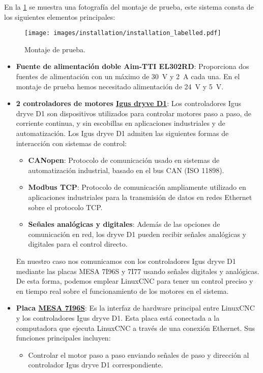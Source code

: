 \documentclass[english,spanish,a4paper,11pt]{article}
\begin{document}
En la \cref{fig:installation} se muestra una fotografía del montaje de prueba, este sistema consta de los siguientes elementos principales:

\begin{figure}[!ht]
    \centering
    \texttt{[image: images/installation/installation\_labelled.pdf]}
    \caption{Montaje de prueba.}
    \label{fig:installation}
\end{figure}


\begin{itemize}
    \item \textbf{Fuente de alimentación doble Aim-TTI EL302RD}: Proporciona dos fuentes de alimentación con un máximo de \qty{30}{\V} y \qty{2}{\A} cada una. En el montaje de prueba hemos necesitado alimentación de \qty{24}{\V} y \qty{5}{\V}.
    
    \item \textbf{2 controladores de motores \href{https://www.igus.eu/product/D1}{Igus dryve D1}}: Los controladores Igus dryve D1 son dispositivos utilizados para controlar motores paso a paso, de corriente continua, y sin escobillas en aplicaciones industriales y de automatización.
    Los Igus dryve D1 admiten las siguientes formas de interacción con sistemas de control:
    \begin{itemize}
        \item \textbf{CANopen}: Protocolo de comunicación usado en sistemas de automatización industrial, basado en el bus CAN (ISO 11898).
            
        \item \textbf{Modbus TCP}: Protocolo de comunicación ampliamente utilizado en aplicaciones industriales para la transmisión de datos en redes Ethernet sobre el protocolo TCP.
    
        \item \textbf{Señales analógicas y digitales}: Además de las opciones de comunicación en red, los dryve D1 pueden recibir señales analógicas y digitales para el control directo.
    \end{itemize}

    En nuestro caso nos comunicamos con los controladores Igus dryve D1 mediante las placas MESA 7I96S y 7I77 usando señales digitales y analógicas. De esta forma, podemos emplear LinuxCNC para tener un control preciso y en tiempo real sobre el funcionamiento de los motores en el sistema.

    
    \item \textbf{Placa \href{http://store.mesanet.com/index.php?route=product/product&product_id=374}{MESA 7I96S}}: Es la interfaz de hardware principal entre LinuxCNC y los controladores Igus dryve D1. Esta placa está conectada a la computadora que ejecuta LinuxCNC a través de una conexión Ethernet. Sus funciones principales incluyen:
    \begin{itemize}
        \item Controlar el motor paso a paso enviando señales de paso y dirección al controlador Igus dryve D1 correspondiente.
        

\end{itemize}
\end{itemize}
\end{document}
